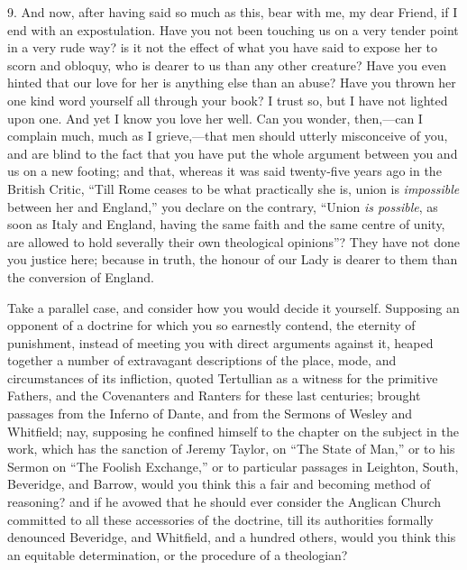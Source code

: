 9. And now, after having said so much as this, bear with me, my dear
Friend, if I end with an expostulation. Have you not been touching
us on a very tender point in a very rude way? is it not the effect of
what you have said to expose her to scorn and obloquy, who is dearer to
us than any other creature? Have you even hinted that our love for her
is anything else than an abuse? Have you thrown her one kind word
yourself all through your book? I trust so, but I have not lighted upon
one. And yet I know you love her well. Can you wonder, then,—can I
complain much, much as I grieve,—that men should utterly misconceive
of you, and are blind to the fact that you have put the whole argument
between you and us on a new footing; and that, whereas it was said
twenty-five years ago in the British Critic, ``Till Rome ceases to
be what practically she is, union is \emph{impossible} between her and
England,'' you declare on the contrary, ``Union \emph{is possible},
as soon as Italy and England, having the same faith and the same centre
of unity, are allowed to hold severally their own theological
opinions''? They have not done you justice here; because in truth,
the honour of our Lady is dearer to them than the conversion of England.

Take a parallel case, and consider how you would decide it yourself.
Supposing an opponent of a doctrine for which you so earnestly contend,
the eternity of punishment, instead of meeting you with direct arguments
against it, heaped together a number of extravagant descriptions of the
place, mode, and circumstances of its infliction, quoted Tertullian as a
witness for the primitive Fathers, and the Covenanters and Ranters for
these last centuries; brought passages from the Inferno of Dante, and from the Sermons of Wesley and Whitfield; nay, supposing he confined
himself to the chapter on the subject in the work, which has the
sanction of Jeremy Taylor, on ``The State of Man,'' or to his
Sermon on ``The Foolish Exchange,'' or to particular passages in
Leighton, South, Beveridge, and Barrow, would you think this a fair and
becoming method of reasoning? and if he avowed that he should ever
consider the Anglican Church committed to all these accessories of the
doctrine, till its authorities formally denounced Beveridge, and
Whitfield, and a hundred others, would you think this an equitable
determination, or the procedure of a theologian?

